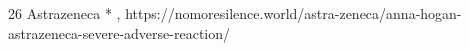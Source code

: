           {
          }
          {
            26
          }
          {
            Astrazeneca
          }
          {
            *
          }
          {
            ,
          }
          {
            https://nomoresilence.world/astra-zeneca/anna-hogan-astrazeneca-severe-adverse-reaction/
          }

